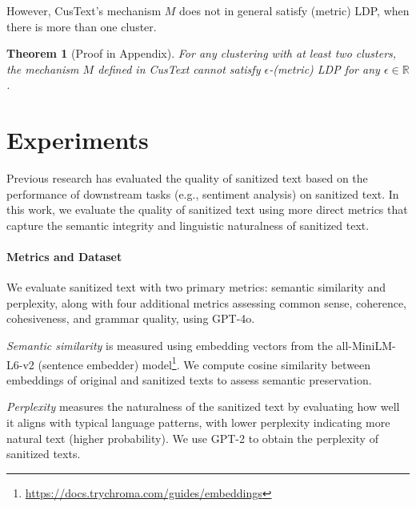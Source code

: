 \documentclass[11pt]{article}
\newtheorem{theorem}{Theorem}
\begin{document}
However, CusText's mechanism $M$ does not in general satisfy (metric) LDP, when there is more than one cluster.

\begin{theorem}[Proof in Appendix] \label{custext_priv}
For any clustering with at least two clusters, the mechanism $M$ defined in CusText cannot satisfy $\epsilon$-(metric) LDP for any $\epsilon\in \mathbb{R}$.
\end{theorem}


















\section{Experiments}
\label{sec:experiments}


Previous research \citep{feyisetan2020privacy, yue2021differential, chen2023customized} has evaluated the quality of sanitized text based on the performance of downstream tasks (e.g., sentiment analysis) on sanitized text. 
In this work, we evaluate the quality of sanitized text using more direct metrics that capture the semantic integrity and linguistic naturalness of sanitized text.

\paragraph{Metrics and Dataset}
We evaluate sanitized text with two primary metrics: semantic similarity and perplexity, along with four additional metrics assessing common sense, coherence, cohesiveness, and grammar quality, using GPT-4o.

\textit{Semantic similarity} is measured using embedding vectors from the all-MiniLM-L6-v2 (sentence embedder) model\footnote{\url{https://docs.trychroma.com/guides/embeddings}}. 
We compute cosine similarity between embeddings of original and sanitized texts to assess semantic preservation.

\textit{Perplexity} measures the naturalness of the sanitized text by evaluating how well it aligns with typical language patterns, with lower perplexity indicating more natural text (higher probability). We use GPT-2 to obtain the perplexity of sanitized texts.
\end{document}
